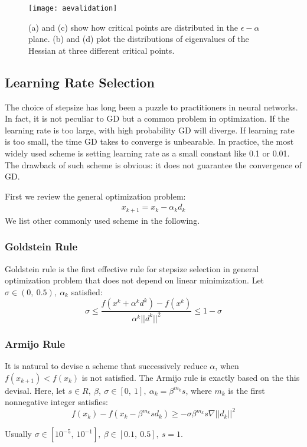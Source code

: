 \begin{figure}[H]
    \centering
    \texttt{[image: aevalidation]}
    \caption{\label{fig:aevalidation}(a) and (c) show how critical points 
    are distributed in the $ \epsilon-\alpha $ plane. (b) and (d) plot the 
    distributions of eigenvalues of the Hessian at three different 
    critical points.}
\end{figure}

\subsection{Learning Rate Selection}
The choice of stepsize has long been a puzzle to practitioners in neural
networks. In fact, it is not peculiar to GD but a common problem in optimization.
If the learning rate is too large, with high probability GD will diverge. If
learning rate is too small, the time GD takes to converge is unbearable.
In practice, the most widely used scheme is setting learning rate as a small
constant like 0.1 or 0.01. The drawback of such scheme is obvious: it does not
guarantee the convergence of GD. 
\par First we review the general optimization problem:
\begin{align*}
    x_{k+1} = x_{k} - \alpha_k d_k
\end{align*}
We list other commonly used scheme in the following.

\subsubsection{Goldstein Rule}
Goldstein rule is the first effective rule for stepsize selection in 
general optimization problem that does not depend on linear minimization. 
Let $ \sigma \in (0,\ 0.5),\ \alpha_k $ satisfied:
\begin{equation}
    \sigma \leq \frac{f\left(x^{k}+\alpha^{k} d^{k}\right)-f\left(x^{k}\right)}{\alpha^{k} ||d^{k}||^2} \leq 1-\sigma
\end{equation}

\subsubsection{Armijo Rule}
\label{sssec:Armijo}
It is natural to devise a scheme that successively reduce $ \alpha $, when 
$ f(x_{k+1}) < f(x_k) $ is not satisfied. The Armijo rule is exactly based
on the this devisal. Here, let $ s \in R,\ \beta,\ \sigma \in [0,\ 1],\ 
\alpha_k=\beta^{m_k}s $, where $ m_k $ is the first nonnegative integer
satisfies:
\begin{equation}
    f(x_{k}) - f(x_{k} - \beta^{m_k}sd_k) \geq -\sigma\beta^{m_k}s\nabla ||d_k||^2
\end{equation}
\par Usually $ \sigma \in [10^{-5},\ 10^{-1}],\ \beta \in [0.1,\ 0.5],\ s=1 $.

